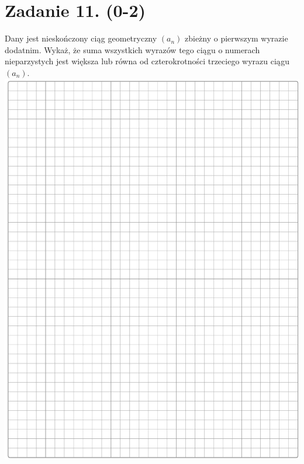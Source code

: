 \documentclass[10pt]{article}
\begin{document}
\section*{Zadanie 11. (0-2)}
Dany jest nieskończony ciąg geometryczny \(\left(a_{n}\right)\) zbieżny o pierwszym wyrazie dodatnim. Wykaż, że suma wszystkich wyrazów tego ciągu o numerach nieparzystych jest większa lub równa od czterokrotności trzeciego wyrazu ciągu \(\left(a_{n}\right)\).\\
\includegraphics[max width=\textwidth, center]{2024_11_21_06df787f12c5337a1fe8g-08}
\end{document}
